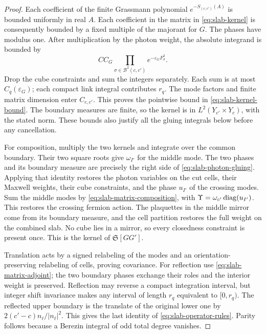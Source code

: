 \begin{proof}
Each coefficient of the finite Grassmann polynomial
$e^{-S_{(c,c')}(A)}$ is bounded uniformly in real $A$. Each coefficient
in the matrix in \eqref{eq:slab-kernel} is consequently bounded by a
fixed multiple of the majorant for $G$. The phases have modulus one.
After multiplication by the photon weight, the absolute integrand is
bounded by
\[
 C C_G\prod_{\sigma\in\mathcal B^2(c,c')}
                           e^{-\varepsilon_GF_\sigma^2}.
\]
Drop the cube constraints and sum the integers separately. Each sum
is at most $C_q(\varepsilon_G)$; each compact link integral contributes
$r_q$. The mode factors and finite matrix dimension enter $C_{c,c'}$.
This proves the pointwise bound in \eqref{eq:slab-kernel-bound}.
The boundary measures are finite, so the kernel is in
$L^2(Y_{c'}\times Y_c)$, with the stated norm. These bounds also
justify all the gluing integrals below before any cancellation.

For composition, multiply the two kernels and integrate over the common
boundary. Their two square roots give $\omega_{I'}$ for the middle
mode. The two phases and its boundary measure are precisely the right
side of \eqref{eq:slab-photon-gluing}. Applying that identity restores
the photon variables on the cut cells, their Maxwell weights, their
cube constraints, and the phase $u_{I'}$ of the crossing modes. Sum
the middle modes by \eqref{eq:slab-matrix-composition}, with
$\Upsilon=\omega_{c'}\operatorname{diag}(u_{I'})$. This restores the crossing
fermion action. The plaquettes in the middle mirror come from its
boundary measure, and the cell partition restores the full weight on
the combined slab. No cube lies in a mirror, so every closedness
constraint is present once. This is the kernel of $\mathfrak S[GG']$.

Translation acts by a signed relabeling of the modes and an
orientation-preserving relabeling of cells, proving covariance.
For reflection use \eqref{eq:slab-matrix-adjoint}; the two boundary
phases exchange their roles and the interior weight is preserved.
Reflection may reverse a compact integration interval, but integer
shift invariance makes any interval of length $r_q$ equivalent to
$[0,r_q)$. The reflected upper boundary is the translate of the
original lower one by $2(c'-c)n_\ell/|n_\ell|^2$. This gives the last
identity of \eqref{eq:slab-operator-rules}. Parity follows because a
Berezin integral of odd total degree vanishes.


\end{proof}
